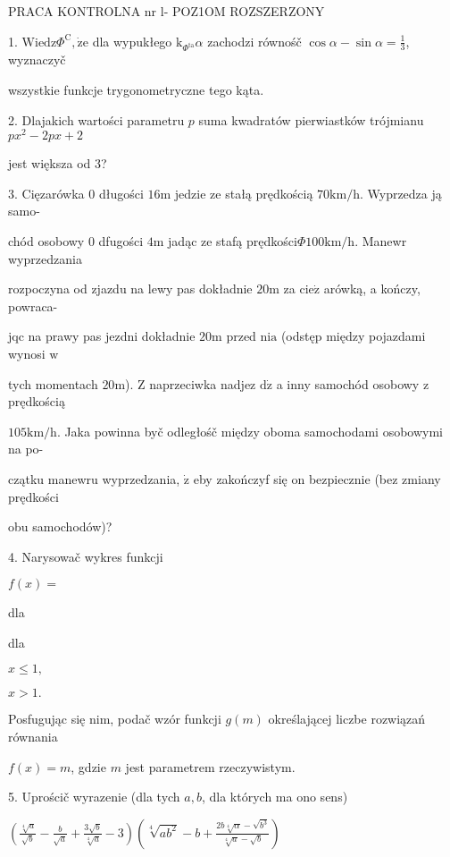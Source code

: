 \documentclass[a4paper,12pt]{article}
\begin{document}
PRACA KONTROLNA nr l- POZ1OM ROZSZERZONY

1. $\mathrm{W}\mathrm{i}\mathrm{e}\mathrm{d}\mathrm{z}\Phi^{\mathrm{C}}, \dot{\mathrm{z}}\mathrm{e}$ dla wypukłego $\mathrm{k}_{\Phi^{\mathrm{t}\mathrm{a}}} \alpha$ zachodzi równośč $\cos\alpha-\sin\alpha = \displaystyle \frac{1}{3}$, wyznaczyč

wszystkie funkcje trygonometryczne tego kąta.

2. Dlajakich wartości parametru $p$ suma kwadratów pierwiastków trójmianu $px^{2}-2px+2$

jest większa od 3?

3. Cięzarówka $0$ długości $16\mathrm{m}$ jedzie ze stałą prędkością $70\mathrm{k}\mathrm{m}/\mathrm{h}$. Wyprzedza ją samo-

chód osobowy $0$ dfugości $4\mathrm{m}$ jadąc ze stafą prędkości$\Phi 100\mathrm{k}\mathrm{m}/\mathrm{h}$. Manewr wyprzedzania

rozpoczyna od zjazdu na lewy pas dokładnie $20\mathrm{m}$ za $\mathrm{c}\mathrm{i}\mathrm{e}\dot{\mathrm{z}}$ arówką, a kończy, powraca-

jqc na prawy pas jezdni dokładnie $20\mathrm{m}$ przed $\mathrm{n}\mathrm{i}\mathrm{a}$ (odstęp między pojazdami wynosi $\mathrm{w}$

tych momentach $20\mathrm{m}$). $\mathrm{Z}$ naprzeciwka nadjez $\mathrm{d}\dot{\mathrm{z}}$ a inny samochód osobowy $\mathrm{z}$ prędkością

$105\mathrm{k}\mathrm{m}/\mathrm{h}$. Jaka powinna byč odległośč między oboma samochodami osobowymi na po-

czątku manewru wyprzedzania, $\dot{\mathrm{z}}$ eby zakończyf się on bezpiecznie (bez zmiany prędkości

obu samochodów)?

4. Narysowač wykres funkcji

$f(x)=$

dla

dla

$x\leq 1,$

$x>1.$

Posfugując się nim, podač wzór funkcji $g(m)$ określającej liczbe rozwiązań równania

$f(x)=m$, gdzie $m$ jest parametrem rzeczywistym.

5. Uprościč wyrazenie (dla tych $a, b$, dla których ma ono sens)

$(\displaystyle \frac{\sqrt[4]{a}}{\sqrt{b}}-\frac{b}{\sqrt{a}}+\frac{3\sqrt{b}}{\sqrt[4]{a}}-3)(\sqrt[4]{ab^{2}}-b+\frac{2b\sqrt[4]{\alpha}-\sqrt{b^{3}}}{\sqrt[4]{a}-\sqrt{b}})$
\end{document}

